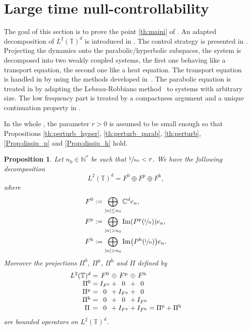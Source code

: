 \documentclass[JEP,XML,SOM,Unicode,NoEqCountersInSection]{cedram}
\theoremstyle{plain}
\newtheorem{prop}[theorem]{Proposition}
\theoremstyle{definition}
\theoremstyle{remark}
\DeclareMathOperator{\Ima}{Im}
\newcommand{\set}{\mathbb}
\newcommand{\N}{\set{N}}
\newcommand{\T}{\set{T}}
\newcommand{\coloneqq}{\mathrel{\mathord{:}\mathord=}}
\newcommand{\h}{{\mathrm h}}
\newcommand{\p}{{\mathrm p}}
\newcommand{\iu}{\mathrm i}
\let\originalleft\left
\let\originalright\right
\renewcommand{\left}{\mathopen{}\mathclose\bgroup\originalleft}
\renewcommand{\right}{\aftergroup\egroup\originalright}
\begin{document}
\section{Large time null-controllability} \label{sec:NC}

The goal of this section is to prove the point \eqref{th:maini} of . An adapted decom\-position of $L^2(\T)^d$ is introduced in . The control strategy is presented in .
Projecting the dynamics onto the parabolic/hyperbolic subspaces, the system is decomposed into two weakly coupled systems, the first one behaving like a transport equation, the second one like a heat equation. The transport equation is handled in  by using the methods developed in~\cite{alabau-boussouira_2017}. The parabolic equation is treated in  by adapting the Lebeau-Robbiano method~\cite{lebeau_1995} to systems with arbitrary size. The low frequency part is treated by a compactness argument and a unique continuation property in .

In the whole , the parameter $r>0$ is assumed to be small enough so that Propositions \ref{th:perturb_hyper}, \ref{th:perturb_parab}, \ref{th:perturb}, \ref{Prop:dissip_p} and \ref{Prop:dissip_h} hold.

\Subsection{An adapted decomposition of $L^2(\T)^{d}$} \label{subsec:decomp}

\begin{prop}
\label{decompL2}
Let $n_0 \in \N^*$ be such that $\sfrac{1}{n_0} < r$. We have the following decomposition
\begin{equation}
\label{DecompRd}
L^2(\T)^{d} = F^0 \oplus F^\p \oplus F^\h,
\end{equation}
where
\begin{align}
\label{defW0}
F^0 &\coloneqq \bigoplus\limits_{|n| \leq n_0} \set C^d e_n,\\
\label{defWp}
F^\p &\coloneqq\bigoplus\limits_{|n| > n_0} \Ima\left(P^\p(\sfrac{\iu}{n})\right) e_n,\\
\label{defWh}
F^\h &\coloneqq\bigoplus\limits_{|n| > n_0} \Ima\left(P^\h(\sfrac{\iu}{n})\right) e_n.
\end{align}
Moreover the projections $\Pi^{0}$, $\Pi^{\p}$, $\Pi^{\h}$ and $\Pi$ defined by
\[
\begin{array}{r@{}c@{}c@{}c@{}c@{}c@{}c@{}c}
L^2(\T)^{d} &{}={}& F^0 & {}\oplus{} & F^\p & {}\oplus{} & F^\h & \\
\Pi^0 &{}={}& I_{F^0} & {}+{} & 0 & {}+{} & 0 & \\
\Pi^\p &{}={}& 0 & {}+{} & I_{F^\p} & {}+{} & 0 & \\
\Pi^\h &{}={}& 0 & {}+{} & 0 & {}+{} & I_{F^\h} & \\
\Pi\, &{}={}& 0 & {}+{} & I_{F^\p} & {}+{} & I_{F^\h} & {}= \Pi^\p+\Pi^\h \end{array}
\]
are bounded operators on $L^2(\T)^d$.
\end{prop}
\end{document}
